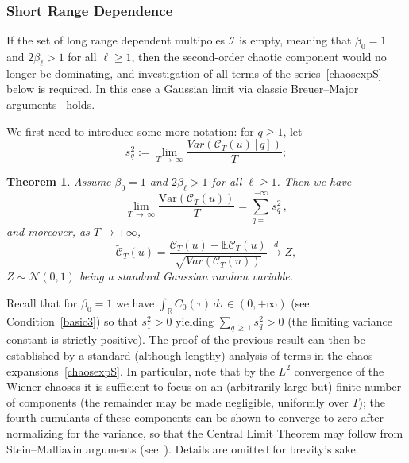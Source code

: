 \documentclass[10pt]{amsart}
\newtheorem{theo}{Theorem}[section]
\theoremstyle{definition}\newtheorem{defi}[theo]{Definition}\newtheorem{rema}[theo]{Remark}\newtheorem{exam}[theo]{Example}\newtheorem{exem}[theo]{Example}\newtheorem{nota}[theo]{Notation}
\newcommand{\clI}{\mathcal{I}}
\newcommand{\clC}{\mathcal{C}}
\newcommand{\clN}{\mathcal{N}}
\newcommand{\bbR}{\mathbb{R}}
\newcommand{\bbE}{\mathbb{E}}
\newcommand{\rVar}{\mathrm{Var}}
\begin{document}
\subsubsection{Short Range Dependence}

If the set of long range dependent multipoles $\clI$ is empty, meaning that $\beta_0=1$ and $2\beta _{\ell }>1$ for all $\ell\ge1$, then the second-order chaotic component would no longer be dominating, and investigation of all terms of the series~\eqref{chaosexpS} below is required. In this case a Gaussian limit via classic Breuer--Major arguments~\cite{BM} holds.

We first need to introduce some more notation: for $q\ge 1$, let
\begin{equation*}
s^2_q:=\lim_{T\,\rightarrow\,\infty}\frac{Var(\clC_T(u)[q])}{T};
\end{equation*}

\begin{theo}\label{quattro}
Assume $\beta_0=1$ and $2\beta _{\ell }>1$ for all $\ell\ge1$. Then we have
\begin{equation*}
\lim_{T\,\rightarrow\,\infty }\frac{\rVar\left(\clC_{T}(u)\right) }{T}=\sum_{q=1}^{+\infty} s_q^2\,,
\end{equation*}
and moreover, as $T\to +\infty$,
\begin{equation*}
\widetilde{\clC}_{T}(u)=\frac{\clC_{T}(u)-\bbE{\clC}_{T}(u)}{\sqrt{Var(\clC_{T}(u))}}\overset{d}{\rightarrow} Z,
\end{equation*}
$Z\sim \clN(0,1)$ being a standard Gaussian random variable.
\end{theo}

Recall that for $\beta_0=1$ we have $\int_{\bbR} C_0(\tau)\,d\tau \in (0,+\infty)$ (see Condition~\ref{basic3}) so that $s_1^2>0$ yielding $
\sum_{q\,\ge\,1}s^2_q >0$ (the limiting variance constant is strictly positive). The proof of the previous result can then be established by a standard (although lengthy) analysis of terms in the chaos expansions~\eqref {chaosexpS}. In particular, note that by the $L^2$ convergence of the Wiener chaoses it is sufficient to focus on an (arbitrarily large but) finite number of components (the remainder may be made negligible, uniformly over $T$); the fourth cumulants of these components can be shown to converge to zero after normalizing for the variance, so that the Central Limit Theorem may follow from Stein--Malliavin arguments (see~\cite{noupebook}). Details are omitted for brevity's sake.
\end{document}
